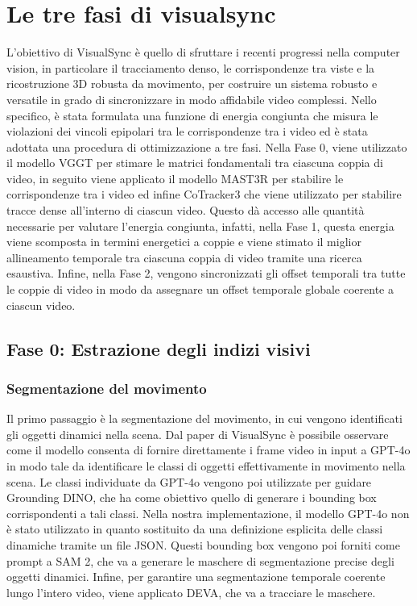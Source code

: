 \section{Le tre fasi di visualsync}
L'obiettivo di VisualSync è quello di sfruttare i recenti progressi nella computer vision, in particolare il tracciamento denso, le corrispondenze tra viste e la ricostruzione 3D robusta da movimento, per costruire un sistema robusto e versatile in grado di sincronizzare in modo affidabile video complessi. Nello specifico, è stata formulata una funzione di energia congiunta che misura le violazioni dei vincoli epipolari tra le corrispondenze tra i video ed è stata adottata una procedura di ottimizzazione a tre fasi.
Nella Fase 0, viene utilizzato il modello VGGT per stimare le matrici fondamentali tra ciascuna coppia di video, in seguito viene applicato il modello MAST3R per stabilire le corrispondenze tra i video ed infine CoTracker3 che viene utilizzato per stabilire tracce dense all'interno di ciascun video. Questo dà accesso alle quantità necessarie per valutare l'energia congiunta, infatti, nella Fase 1, questa energia viene scomposta in termini energetici a coppie e viene stimato il miglior allineamento temporale tra ciascuna coppia di video tramite una ricerca esaustiva. Infine, nella Fase 2, vengono sincronizzati gli offset temporali tra tutte le coppie di video in modo da assegnare un offset temporale globale coerente a ciascun video.

\subsection{Fase 0: Estrazione degli indizi visivi}

\subsubsection{Segmentazione del movimento}
Il primo passaggio è la segmentazione del movimento, in cui vengono identificati gli oggetti dinamici nella scena. Dal paper di VisualSync è possibile osservare come il modello consenta di fornire direttamente i frame video in input a GPT-4o in modo tale da identificare le classi di oggetti effettivamente in movimento nella scena. Le classi individuate da GPT-4o vengono poi utilizzate per guidare Grounding DINO, che ha come obiettivo quello di generare i bounding box corrispondenti a tali classi. Nella nostra implementazione, il modello GPT-4o non è stato utilizzato in quanto sostituito da una definizione esplicita delle classi dinamiche tramite un file JSON. Questi bounding box vengono poi forniti come prompt a SAM 2, che va a generare le maschere di segmentazione precise degli oggetti dinamici. Infine, per garantire una segmentazione temporale coerente lungo l'intero video, viene applicato DEVA, che va a tracciare le maschere.


